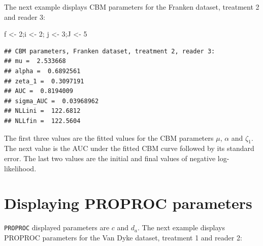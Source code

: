\documentclass[
]{book}
\newenvironment{Shaded}{\begin{snugshade}}{\end{snugshade}}
\newcommand{\CharTok}[1]{\textcolor[rgb]{0.31,0.60,0.02}{#1}}
\newcommand{\DecValTok}[1]{\textcolor[rgb]{0.00,0.00,0.81}{#1}}
\newcommand{\KeywordTok}[1]{\textcolor[rgb]{0.13,0.29,0.53}{\textbf{#1}}}
\newcommand{\NormalTok}[1]{#1}
\newcommand{\OperatorTok}[1]{\textcolor[rgb]{0.81,0.36,0.00}{\textbf{#1}}}
\newcommand{\StringTok}[1]{\textcolor[rgb]{0.31,0.60,0.02}{#1}}
\begin{document}
The next example displays CBM parameters for the Franken dataset, treatment 2 and reader 3:

\begin{Shaded}
\begin{Highlighting}[]
\NormalTok{f <-}\StringTok{ }\DecValTok{2}\NormalTok{;i <-}\StringTok{ }\DecValTok{2}\NormalTok{; j <-}\StringTok{ }\DecValTok{3}\NormalTok{;J <-}\StringTok{ }\DecValTok{5}
\end{Highlighting}
\end{Shaded}

\begin{verbatim}
## CBM parameters, Franken dataset, treatment 2, reader 3: 
## mu =  2.533668 
## alpha =  0.6892561 
## zeta_1 =  0.3097191 
## AUC =  0.8194009 
## sigma_AUC =  0.03968962 
## NLLini =  122.6812 
## NLLfin =  122.5604
\end{verbatim}

The first three values are the fitted values for the CBM parameters \(\mu\), \(\alpha\) and \(\zeta_1\). The next value is the AUC under the fitted CBM curve followed by its standard error. The last two values are the initial and final values of negative log-likelihood.

\hypertarget{rsm-3-fits-proproc-parameters}{%
\section{Displaying PROPROC parameters}\label{rsm-3-fits-proproc-parameters}}

\texttt{PROPROC} displayed parameters are \(c\) and \(d_a\). The next example displays PROPROC parameters for the Van Dyke dataset, treatment 1 and reader 2:

\begin{Shaded}
\end{Shaded}
\end{document}
